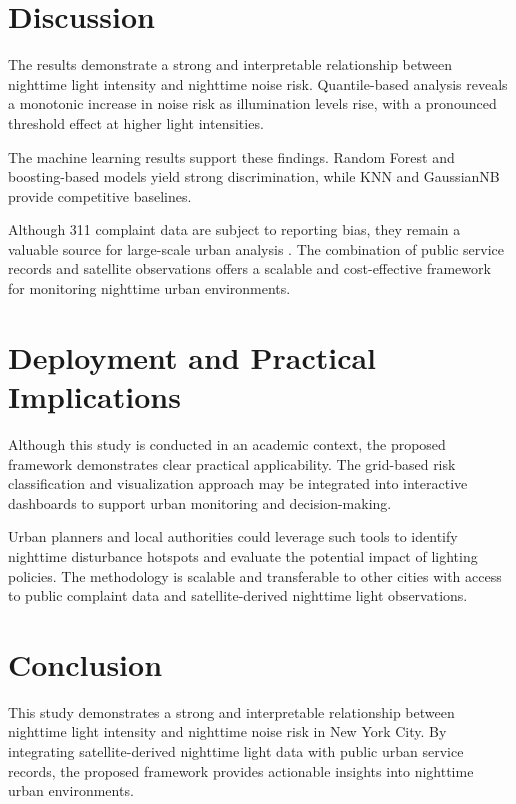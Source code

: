 \documentclass[conference]{IEEEtran}
\begin{document}
\section{Discussion}

The results demonstrate a strong and interpretable relationship between nighttime
light intensity and nighttime noise risk.
Quantile-based analysis reveals a monotonic increase in noise risk as illumination
levels rise, with a pronounced threshold effect at higher light intensities.

The machine learning results support these findings.
Random Forest and boosting-based models yield strong discrimination, while KNN and
GaussianNB provide competitive baselines.

Although 311 complaint data are subject to reporting bias, they remain a valuable
source for large-scale urban analysis \cite{kontokosta2021bias}.
The combination of public service records and satellite observations offers a scalable
and cost-effective framework for monitoring nighttime urban environments.

\section{Deployment and Practical Implications}

Although this study is conducted in an academic context, the proposed framework
demonstrates clear practical applicability.
The grid-based risk classification and visualization approach may be integrated
into interactive dashboards to support urban monitoring and decision-making.

Urban planners and local authorities could leverage such tools to identify
nighttime disturbance hotspots and evaluate the potential impact of lighting policies.
The methodology is scalable and transferable to other cities with access to
public complaint data and satellite-derived nighttime light observations.

\section{Conclusion}

This study demonstrates a strong and interpretable relationship between nighttime
light intensity and nighttime noise risk in New York City.
By integrating satellite-derived nighttime light data with public urban service
records, the proposed framework provides actionable insights into nighttime urban
environments.
\end{document}
